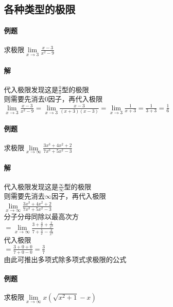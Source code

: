 \documentclass{article}
\begin{document}
\begin{flushleft}
	
	\section{各种类型的极限}
	
	\paragraph{例题}
	求极限$\lim\limits_{x\to 3}\frac{x-3}{x^2-9}$
	\paragraph{解}
	代入极限发现这是$\frac{0}{0}$型的极限\\
	则需要先消去$0$因子，再代入极限\\
	$\lim\limits_{x\to 3}\frac{x-3}{x^2-9}=\lim\limits_{x\to 3}\frac{x-3}{(x+3)(x-3)}=\lim\limits_{x\to 3}\frac{1}{x+3}=\frac{1}{3+3}=\frac{1}{6}$\\
	

	\paragraph{例题}
	求极限$\lim\limits_{x\to \infty}\frac{3x^3+4x^2+2}{7x^3+5x^2-3}$
	\paragraph{解}
	代入极限发现这是$\frac{\infty}{\infty}$型的极限\\
	则需要先消去$\infty$因子，再代入极限\\
	$\lim\limits_{x\to \infty}\frac{3x^3+4x^2+2}{7x^3+5x^2-3}$\\
	分子分母同除以最高次方\\
	$=\lim\limits_{x\to \infty}\frac{3+\frac{4}{x}+\frac{2}{x^3}}{7+\frac{5}{x}-\frac{3}{x^3}}$\\
	代入极限\\
	$=\frac{3+0+0}{7+0-0}=\frac{3}{7}$\\
	由此可推出多项式除多项式求极限的公式\\
	
	\paragraph{例题}
	求极限$\lim\limits_{x\to \infty}x(\sqrt{x^2+1}-x)$

\end{flushleft}
\end{document}
